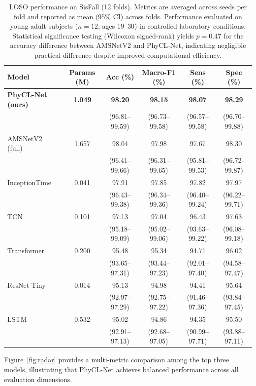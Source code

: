 \documentclass{article}
\begin{document}
\begin{table}[htbp]
\caption{LOSO performance on SisFall (12 folds). Metrics are averaged across seeds per fold and reported as mean (95\% CI) across folds. Performance evaluated on young adult subjects ($n=12$, ages 19--30) in controlled laboratory conditions. Statistical significance testing (Wilcoxon signed-rank) yields $p=0.47$ for the accuracy difference between AMSNetV2 and PhyCL-Net, indicating negligible practical difference despite improved computational efficiency.}
\label{tab:main_results}
\centering
\small
\begin{tabular}{lccccc}
\toprule
Model & Params (M) & Acc (\%) & Macro-F1 (\%) & Sens (\%) & Spec (\%) \\
\midrule
\textbf{PhyCL-Net (ours)} & \textbf{1.049} & \textbf{98.20} & \textbf{98.15} & \textbf{98.07} & \textbf{98.29} \\
 & & (96.81--99.59) & (96.73--99.58) & (96.57--99.58) & (96.70--99.88) \\
\midrule
AMSNetV2 (full) & 1.657 & 98.04 & 97.98 & 97.67 & 98.30 \\
 & & (96.41--99.66) & (96.31--99.65) & (95.81--99.53) & (96.72--99.87) \\
\midrule
InceptionTime & 0.041 & 97.91 & 97.85 & 97.82 & 97.97 \\
 & & (96.43--99.38) & (96.34--99.36) & (96.40--99.24) & (96.22--99.71) \\
\midrule
TCN & 0.101 & 97.13 & 97.04 & 96.43 & 97.63 \\
 & & (95.18--99.09) & (95.02--99.06) & (93.63--99.22) & (96.08--99.18) \\
\midrule
Transformer & 0.200 & 95.48 & 95.34 & 94.71 & 96.02 \\
 & & (93.65--97.31) & (93.44--97.23) & (92.01--97.40) & (94.58--97.47) \\
\midrule
ResNet-Tiny & 0.014 & 95.13 & 94.98 & 94.41 & 95.64 \\
 & & (92.97--97.29) & (92.75--97.22) & (91.46--97.36) & (93.84--97.45) \\
\midrule
LSTM & 0.532 & 95.02 & 94.86 & 94.35 & 95.50 \\
 & & (92.91--97.13) & (92.68--97.05) & (90.99--97.71) & (93.88--97.11) \\
\bottomrule
\end{tabular}
\end{table}

Figure~\ref{fig:radar} provides a multi-metric comparison among the top three models, illustrating that PhyCL-Net achieves balanced performance across all evaluation dimensions.
\end{document}
